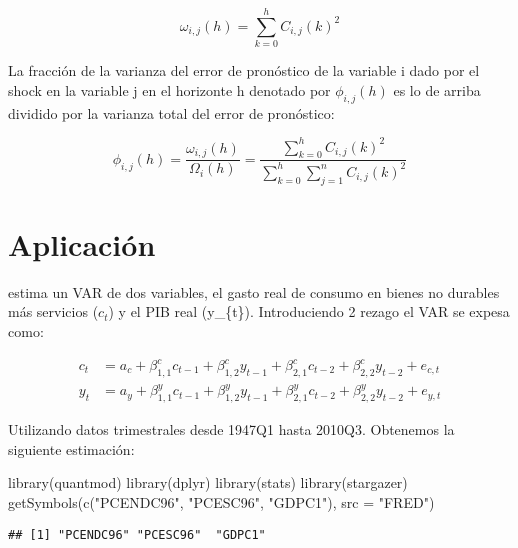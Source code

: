 \documentclass[
]{book}
\newenvironment{Shaded}{\begin{snugshade}}{\end{snugshade}}
\newcommand{\AttributeTok}[1]{\textcolor[rgb]{0.77,0.63,0.00}{#1}}
\newcommand{\FunctionTok}[1]{\textcolor[rgb]{0.00,0.00,0.00}{#1}}
\newcommand{\NormalTok}[1]{#1}
\newcommand{\StringTok}[1]{\textcolor[rgb]{0.31,0.60,0.02}{#1}}
\begin{document}
\begin{equation}
\omega_{i, j}(h)=\sum_{k=0}^{h} C_{i,j}(k)^{2}
\end{equation}

La fracción de la varianza del error de pronóstico de la variable i dado por el shock en la variable j en el horizonte h denotado por \(\phi_{i,j}(h)\) es lo de arriba dividido por la varianza total del error de pronóstico:

\begin{equation}
\phi_{i,j}(h)=\frac{\omega_{i, j}(h)}{\Omega_{i}(h)}=\frac{\sum_{k=0}^{h} C_{i,j}(k)^{2}}{\sum_{k=0}^{h} \sum_{j=1}^{n}C_{i,j}(k)^{2}}
\end{equation}

\hypertarget{aplicaciuxf3n-cochrane94}{%
\section{\texorpdfstring{Aplicación \citet{COCHRANE94}}{Aplicación @COCHRANE94}}\label{aplicaciuxf3n-cochrane94}}

\citet{COCHRANE94} estima un VAR de dos variables, el gasto real de consumo en bienes no durables más servicios (\(c_{t}\)) y el PIB real (y\_\{t\}). Introduciendo 2 rezago el VAR se expesa como:

\begin{align}
c_{t}&= a_{c}+\beta_{1,1}^{c}c_{t-1}+\beta_{1,2}^{c}y_{t-1}+\beta_{2,1}^{c}c_{t-2}+\beta_{2,2}^{c}y_{t-2}+e_{c,t}\\
y_{t}&= a_{y}+\beta_{1,1}^{y}c_{t-1}+\beta_{1,2}^{y}y_{t-1}+\beta_{2,1}^{y}c_{t-2}+\beta_{2,2}^{y}y_{t-2}+e_{y,t}
\end{align}

Utilizando datos trimestrales desde 1947Q1 hasta 2010Q3. Obtenemos la siguiente estimación:

\begin{Shaded}
\begin{Highlighting}[]
\FunctionTok{library}\NormalTok{(quantmod)}
\FunctionTok{library}\NormalTok{(dplyr)}
\FunctionTok{library}\NormalTok{(stats)}
\FunctionTok{library}\NormalTok{(stargazer)}
\FunctionTok{getSymbols}\NormalTok{(}\FunctionTok{c}\NormalTok{(}\StringTok{"PCENDC96"}\NormalTok{, }\StringTok{"PCESC96"}\NormalTok{, }\StringTok{"GDPC1"}\NormalTok{),}
           \AttributeTok{src =} \StringTok{"FRED"}\NormalTok{)}
\end{Highlighting}
\end{Shaded}

\begin{verbatim}
## [1] "PCENDC96" "PCESC96"  "GDPC1"
\end{verbatim}
\end{document}
